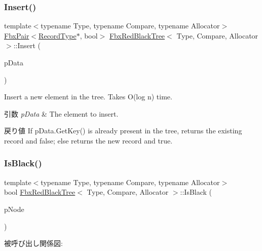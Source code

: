 \subsubsection{\texorpdfstring{Insert()}{Insert()}}
{\footnotesize\ttfamily template$<$typename Type, typename Compare, typename Allocator$>$ \\
\hyperlink{class_fbx_pair}{Fbx\+Pair}$<$\hyperlink{class_fbx_red_black_tree_1_1_record_type}{Record\+Type}$\ast$, bool$>$ \hyperlink{class_fbx_red_black_tree}{Fbx\+Red\+Black\+Tree}$<$ Type, Compare, Allocator $>$\+::Insert (\begin{DoxyParamCaption}\item[{const \hyperlink{class_fbx_red_black_tree_a9bd3feb4c82e7d105bc475f01a9a199d}{Data\+Type} \&}]{p\+Data }\end{DoxyParamCaption})}

Insert a new element in the tree. Takes O(log n) time. 
\begin{DoxyParams}{引数}
{\em p\+Data} & The element to insert. \\
\hline
\end{DoxyParams}
\begin{DoxyReturn}{戻り値}
If p\+Data.\+Get\+Key() is already present in the tree, returns the existing record and false; else returns the new record and true. 
\end{DoxyReturn}
\mbox{\label{class_fbx_red_black_tree_ab737a7f1323fcfce74268072f266ea28}} 
\subsubsection{\texorpdfstring{Is\+Black()}{IsBlack()}}
{\footnotesize\ttfamily template$<$typename Type, typename Compare, typename Allocator$>$ \\
bool \hyperlink{class_fbx_red_black_tree}{Fbx\+Red\+Black\+Tree}$<$ Type, Compare, Allocator $>$\+::Is\+Black (\begin{DoxyParamCaption}\item[{const \hyperlink{class_fbx_red_black_tree_1_1_record_type}{Record\+Type} $\ast$}]{p\+Node }\end{DoxyParamCaption})\hspace{0.3cm}{\ttfamily [protected]}}

被呼び出し関係図\+:
\mbox{\label{class_fbx_red_black_tree_a91db157ad267d601b364522e823bb435}} 
